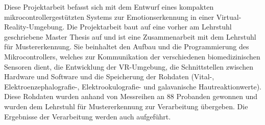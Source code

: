 Diese Projektarbeit befasst sich mit dem Entwurf eines kompakten mikrocontrollergest{\"u}tzten Systems zur Emotionserkennung in einer Virtual-Reality-Umgebung. 
Die Projektarbeit baut auf eine vorher am Lehrstuhl geschriebene Master Thesis  auf\cite{msckroenert} und ist eine Zusammenarbeit mit dem Lehrstuhl f{\"u}r Mustererkennung. 
Sie beinhaltet den Aufbau und die Programmierung des Mikrocontrollers, welches zur Kommunikation der verschiedenen biomedizinischen Sensoren dient, die Entwicklung der VR-Umgebung, die Schnittstellen zwischen Hardware und Software und die Speicherung der Rohdaten (Vital-, Elektroenzephalografie-, Elektrookulografie- und galavanische Hautreaktionwerte). 
Diese Rohdaten wurden anhand von Messreihen an 88 Probanden gewonnen und wurden dem Lehrstuhl f{\"u}r Mustererkennung zur Verarbeitung {\"u}bergeben. Die Ergebnisse der Verarbeitung werden auch aufgef{\"u}hrt.  


